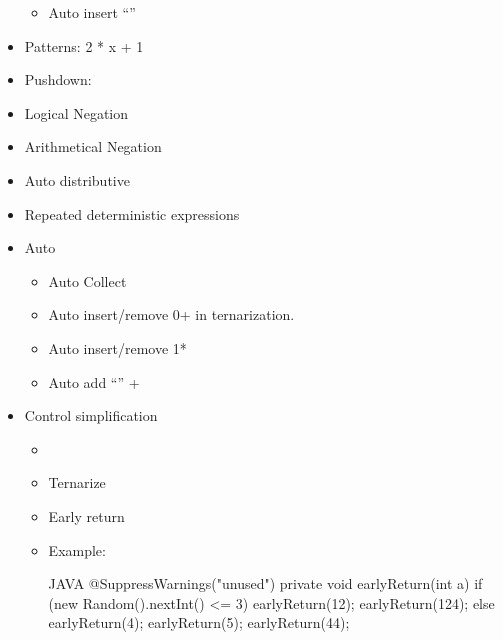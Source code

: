 \begin{itemize}
\begin{itemize}
 \item Auto insert “”
\end{itemize}
\item Patterns: 2 * x + 1
\item Pushdown:
\item Logical Negation
\item Arithmetical Negation
\item Auto distributive
\item Repeated deterministic expressions
\item Auto
\begin{itemize}
 \item Auto Collect
 \item Auto insert/remove 0+ in ternarization.
 \item Auto insert/remove 1*
 \item Auto add “” +
\end{itemize}

\item Control simplification
\begin{itemize}
  \item \item Ternarize
  \item Early return
  \item Example: 
\begin{code}{JAVA}
@SuppressWarnings("unused") private
void earlyReturn(int a) {
  if (new Random().nextInt() <= 3) {
    earlyReturn(12);
    earlyReturn(124);
    } else {
    earlyReturn(4);
    earlyReturn(5);
    earlyReturn(44);
  }
}
\end{code}
    \end{itemize}
\end{itemize}
